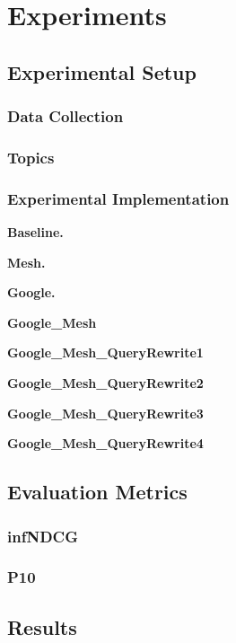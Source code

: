 \documentclass{IEEEtran}
\begin{document}
\section{Experiments}
\subsection{Experimental Setup}
\subsubsection{Data Collection}

\subsubsection{Topics}

\subsubsection{Experimental Implementation}

\textbf{Baseline.}

\textbf{Mesh.}

\textbf{Google.}


\textbf{Google\_Mesh}

\textbf{Google\_Mesh\_QueryRewrite1}

\textbf{Google\_Mesh\_QueryRewrite2}

\textbf{Google\_Mesh\_QueryRewrite3}

\textbf{Google\_Mesh\_QueryRewrite4}

\subsection{Evaluation Metrics}
\subsubsection{infNDCG}

\subsubsection{P10}

\subsection{Results}
\end{document}
